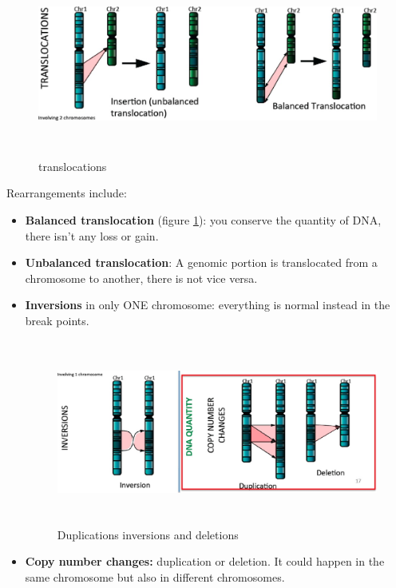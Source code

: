 \begin{figure}[H]
  \includegraphics[width=6.1748in,height=2.09646in]{image6.jpeg}\\
  \centering
  \caption{translocations}
  \label{fig: translocations}
\end{figure}

Rearrangements include:

\begin{itemize}
  \item \textbf{Balanced translocation} (figure \ref{fig: translocations}): you conserve the quantity of DNA, there
  isn't any loss or gain.
  
  \item \textbf{Unbalanced translocation}: A genomic portion is translocated
  from a chromosome to another, there is not vice versa.
  
  \item \textbf{Inversions} in only ONE chromosome: everything is normal instead
  in the break points.

  \begin{figure}[H]
    \includegraphics[width=6.22722in,height=2.39062in]{image7.jpeg}
    \centering
    \caption{Duplications inversions and deletions}
    \label{fig: Duplications inversions and deletions}
  \end{figure}

  \item \textbf{Copy number changes:} duplication or deletion. It could happen in
  the same chromosome but also in different chromosomes.
\end{itemize}

